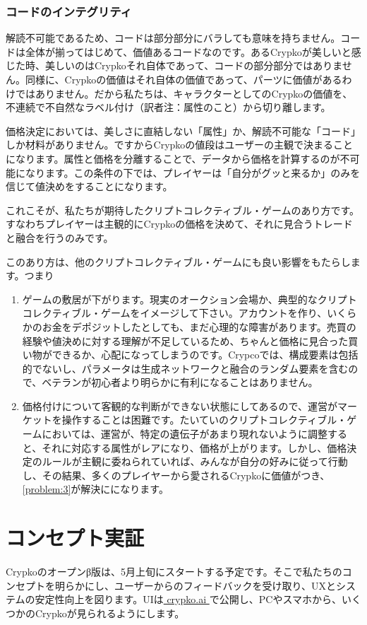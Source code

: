 \documentclass[a4paper]{article}
\begin{document}
\subsubsection{コードのインテグリティ}

解読不可能であるため、コードは部分部分にバラしても意味を持ちません。コードは全体が揃ってはじめて、価値あるコードなのです。あるCrypkoが美しいと感じた時、美しいのはCrypkoそれ自体であって、コードの部分部分ではありません。同様に、Crypkoの価値はそれ自体の価値であって、パーツに価値があるわけではありません。だから私たちは、キャラクターとしてのCrypkoの価値を、不連続で不自然なラベル付け（訳者注：属性のこと）から切り離します。

価格決定においては、美しさに直結しない「属性」か、解読不可能な「コード」しか材料がありません。ですからCrypkoの値段はユーザーの主観で決まることになります。属性と価格を分離することで、データから価格を計算するのが不可能になります。この条件の下では、プレイヤーは「自分がグッと来るか」のみを信じて値決めをすることになります。

これこそが、私たちが期待したクリプトコレクティブル・ゲームのあり方です。すなわちプレイヤーは主観的にCrypkoの価格を決めて、それに見合うトレードと融合を行うのみです。

このあり方は、他のクリプトコレクティブル・ゲームにも良い影響をもたらします。つまり

\begin{enumerate}
	\item ゲームの敷居が下がります。現実のオークション会場か、典型的なクリプトコレクティブル・ゲームをイメージして下さい。アカウントを作り、いくらかのお金をデポジットしたとしても、まだ心理的な障害があります。売買の経験や値決めに対する理解が不足しているため、ちゃんと価格に見合った買い物ができるか、心配になってしまうのです。Crypcoでは、構成要素は包括的でないし、パラメータは生成ネットワークと融合のランダム要素を含むので、ベテランが初心者より明らかに有利になることはありません。
	\item 価格付けについて客観的な判断ができない状態にしてあるので、運営がマーケットを操作することは困難です。たいていのクリプトコレクティブル・ゲームにおいては、運営が、特定の遺伝子があまり現れないように調整すると、それに対応する属性がレアになり、価格が上がります。しかし、価格決定のルールが主観に委ねられていれば、みんなが自分の好みに従って行動し、その結果、多くのプレイヤーから愛されるCrypkoに価値がつき、\ref{problem:3}が解決にになります。

\end{enumerate}

\section{コンセプト実証}
Crypkoのオープンβ版は、5月上旬にスタートする予定です。そこで私たちのコンセプトを明らかにし、ユーザーからのフィードバックを受け取り、UXとシステムの安定性向上を図ります。UIは\href{http://crypko.ai}{ crypko.ai }で公開し、PCやスマホから、いくつかのCrypkoが見られるようにします。
\end{document}

